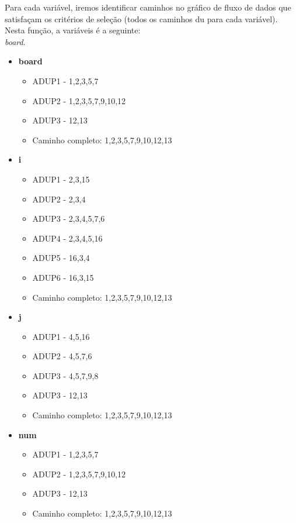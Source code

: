 \documentclass{article}
\begin{document}
\begin{itemize}
\begin{enumerate}
    Para cada variável, iremos identificar caminhos no gráfico de fluxo de dados que satisfaçam os critérios de seleção (todos os caminhos du
para cada variável).
    Nesta função, a variáveis é a seguinte:\\
    \textit{board}.
    \begin{itemize}
        \item \textbf{board}
        \begin{itemize}
            \item ADUP1 - 1,2,3,5,7
            \item ADUP2 - 1,2,3,5,7,9,10,12
            \item ADUP3 - 12,13
            \item Caminho completo: 1,2,3,5,7,9,10,12,13
        \end{itemize}
        \item \textbf{i}
        \begin{itemize}
            \item ADUP1 - 2,3,15
            \item ADUP2 - 2,3,4
            \item ADUP3 - 2,3,4,5,7,6
            \item ADUP4 - 2,3,4,5,16
            \item ADUP5 - 16,3,4
            \item ADUP6 - 16,3,15
            \item Caminho completo: 1,2,3,5,7,9,10,12,13
        \end{itemize}
        \item \textbf{j}
        \begin{itemize}
            \item ADUP1 - 4,5,16
            \item ADUP2 - 4,5,7,6
            \item ADUP3 - 4,5,7,9,8
            \item ADUP3 - 12,13
            \item Caminho completo: 1,2,3,5,7,9,10,12,13
        \end{itemize}
        \item \textbf{num}
        \begin{itemize}
            \item ADUP1 - 1,2,3,5,7
            \item ADUP2 - 1,2,3,5,7,9,10,12
            \item ADUP3 - 12,13
            \item Caminho completo: 1,2,3,5,7,9,10,12,13

\end{itemize}
\end{itemize}
\end{enumerate}
\end{itemize}
\end{document}
